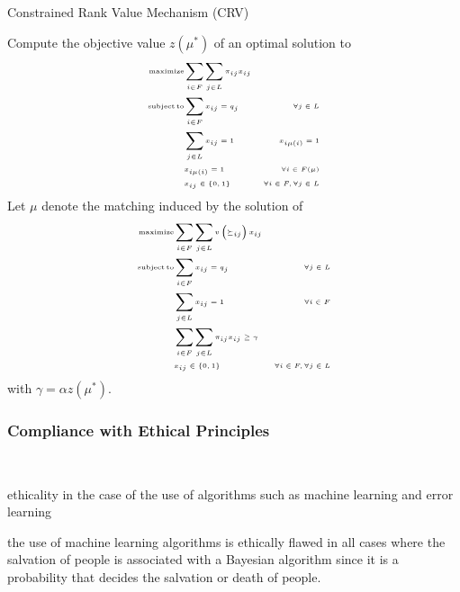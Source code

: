     \begin{algorithm}
        \caption{Constrained Rank Value Mechanism (CRV)}\label{alg:crv}
        \KwResult{\(\mu\)}
        Compute the objective value \( z \left( \mu ^ { * } \right) \) of an optimal solution to
        \[\tiny
            \begin{aligned}
                \operatorname{maximize} & \sum_{i \in F} \sum_{j \in L} \pi_{i j} x_{i j} \\
                \operatorname {subject}\operatorname{to} & \sum_{i \in F} x_{i j}=q_{j} & \forall j \in L \\
                & \sum_{j \in L} x_{i j}=1 & x_{i \mu(i)}=1 \\
                & x_{i\mu (i)} = 1 &  \forall i \in F(\mu) \\
                & x_{i j} \in\{0,1\} & \forall i \in F, \forall j \in L
            \end{aligned}
        \]%
        Let \( \mu \) denote the matching induced by the solution of
        \[\tiny
            \begin{aligned}
                \operatorname{maximize} & \sum_{i \in F} \sum_{j \in L} v\left(\succeq_{i j}\right) x_{i j} \\
                \operatorname {subject}\operatorname{to} & \sum_{i \in F} x_{i j}=q_{j} & \forall j \in L \\
                & \sum_{j \in L} x_{i j}=1 & \forall i \in F \\
                & \sum_{i \in F} \sum_{j \in L} \pi_{i j} x_{i j} \geq \gamma \\
                & x_{i j} \in\{0,1\} & \forall i \in F, \forall j \in L
            \end{aligned}
        \]%
        with \( \gamma = \alpha z \left( \mu ^ { * } \right) \).
    \end{algorithm}

    \subsubsection{Compliance with Ethical Principles}\label{compliance-with-ethical-principles}~\citet{basshuysen}

    ethicality in the case of the use of algorithms such as machine learning and error learning

    the use of machine learning algorithms is ethically flawed in all cases where the salvation of people is associated
    with a Bayesian algorithm since it is a probability that decides the salvation or death of people.